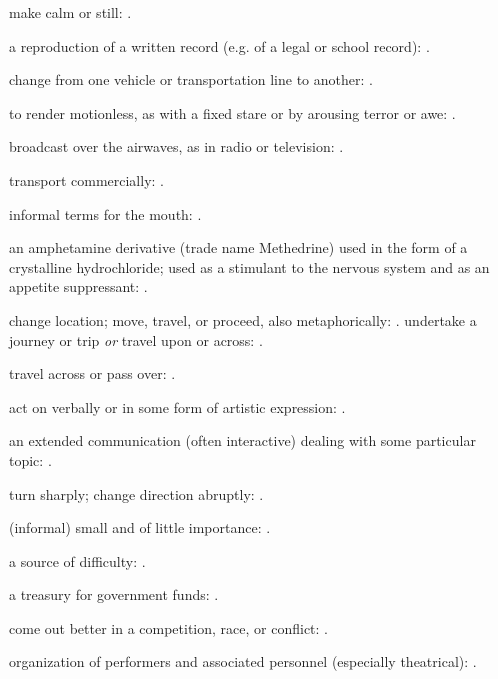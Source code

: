   make calm or still: .

  a reproduction of a written record (e.g. of a legal or school record): .

  change from one vehicle or transportation line to another: .

  to render motionless, as with a fixed stare or by arousing terror or awe: .

  broadcast over the airwaves, as in radio or television: .

  transport commercially: .

  informal terms for the mouth: .

  an amphetamine derivative (trade name Methedrine) used in the form of a crystalline hydrochloride; used as a stimulant to the nervous system and as an appetite suppressant: .

  change location; move, travel, or proceed, also metaphorically: . undertake a journey or trip \textit{or} travel upon or across: .

  travel across or pass over: .

  act on verbally or in some form of artistic expression: .

  an extended communication (often interactive) dealing with some particular topic: .

  turn sharply; change direction abruptly: .

  (informal) small and of little importance: .

  a source of difficulty: .

  a treasury for government funds: .

  come out better in a competition, race, or conflict: .

  organization of performers and associated personnel (especially theatrical): .

